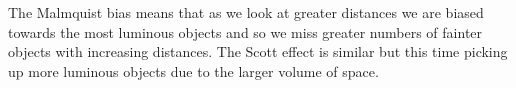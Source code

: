 \documentclass[a4paper,12pt]{article}
\begin{document}
\section{}
The Malmquist bias means that as we look at greater distances we are biased towards the most luminous objects and so we miss greater numbers of fainter objects with increasing distances.
The Scott effect is similar but this time picking up more luminous objects due to the larger volume of space.
\end{document}
